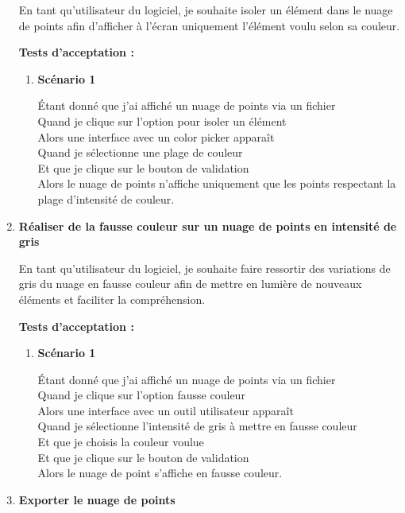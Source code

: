 \documentclass[12pt,titlepage,french]{article}
\begin{document}
\begin{enumerate}
En tant qu'utilisateur du logiciel, je souhaite isoler un élément dans le nuage de points afin d'afficher à l'écran uniquement l'élément voulu selon sa couleur.

\textbf{Tests d'acceptation :}

\begin{enumerate}
    \item \textbf{Scénario 1}
    
Étant donné que j'ai affiché un nuage de points via un fichier\\
Quand je clique sur l'option pour isoler un élément\\
Alors une interface avec un color picker apparaît\\
Quand je sélectionne une plage de couleur\\
Et que je clique sur le bouton de validation\\
Alors le nuage de points n'affiche uniquement que les points respectant la plage d'intensité de couleur.

\end{enumerate}
\item \textbf{Réaliser de la fausse couleur sur un nuage de points en intensité de gris}

En tant qu'utilisateur du logiciel, je souhaite faire ressortir des variations de gris du nuage en fausse couleur afin de mettre en lumière de nouveaux éléments et faciliter la compréhension.

\textbf{Tests d'acceptation :}

\begin{enumerate}
    \item \textbf{Scénario 1}
    
Étant donné que j'ai affiché un nuage de points via un fichier\\
Quand je clique sur l'option fausse couleur\\
Alors une interface avec un outil utilisateur apparaît\\
Quand je sélectionne l'intensité de gris à mettre en fausse couleur\\
Et que je choisis la couleur voulue\\
Et que je clique sur le bouton de validation\\
Alors le nuage de point s'affiche en fausse couleur.
\end{enumerate}

\item \textbf{Exporter le nuage de points}
    

\end{enumerate}
\end{document}
